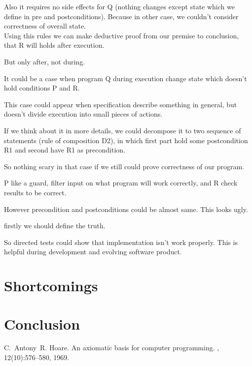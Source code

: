 \documentclass[twoside,twocolumn]{article}
\begin{document}
Also it requires no side effects for Q (nothing changes except state which
we define in pre and postconditions). Because in other case, we couldn't
consider correctness of overall state. \\

Using this rules we can make deductive proof from our premise to conclusion,
that R will holds after execution. 

But only after, not during.

It could be a case when program Q during execution
change state which doesn't hold conditions P and R.

This case could appear when specification describe something in general, but
doesn't divide execution into small pieces of actions.

If we think about it in more details, we could decompose it to two sequence of
statements (rule of composition D2), in which first part hold some postcondition
R1 and second have R1 as precondition.

So nothing scary in that case if we still could prove correctness of our program.

P like a guard, filter input on what program will work correctly, and R check
results to be correct. 





However precondition and postconditions could be almost same. This looks ugly.

firstly we should define the
truth. 

So directed tests could show that implementation isn't work properly. This is
helpful during development and evolving software product.





\section{Shortcomings}

\section{Conclusion}

\begin{thebibliography}{99} %

C.~Antony~R. Hoare.
\newblock An axiomatic basis for computer programming.
, 12(10):576--580, 1969.

\end{thebibliography}

\end{document}
